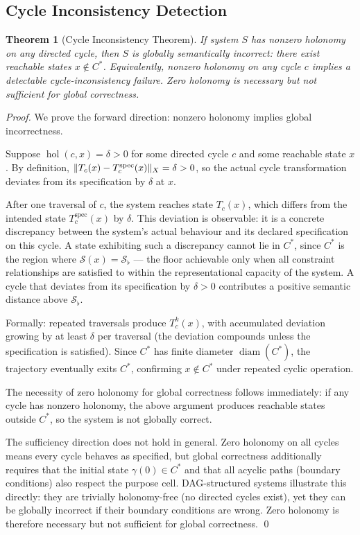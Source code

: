 \documentclass[twocolumn,a4paper,11pt]{article}
\theoremstyle{plain}
\newtheorem{theorem}{Theorem}[section]
\theoremstyle{definition}
\theoremstyle{remark}
\DeclareMathOperator{\hol}{hol}
\DeclareMathOperator{\diam}{diam}
\DeclarePairedDelimiter{\norm}{\lVert}{\rVert}
\newcommand{\Sflat}{\mathcal{S}_{\flat}}
\begin{document}
\subsection{Cycle Inconsistency Detection}

\begin{theorem}[Cycle Inconsistency Theorem]
\label{thm:hac}
If system $S$ has nonzero holonomy on any directed cycle, then $S$ is
globally semantically incorrect: there exist reachable states $x \notin C^*$.
Equivalently, nonzero holonomy on any cycle $c$ implies a detectable
cycle-inconsistency failure. Zero holonomy is necessary but not sufficient
for global correctness.
\end{theorem}

\begin{proof}
We prove the forward direction: nonzero holonomy implies global incorrectness.

Suppose $\hol(c, x) = \delta > 0$ for some directed cycle $c$ and some
reachable state $x$. By definition,
$\norm{T_c(x) - T_c^{\mathrm{spec}}(x)}_X = \delta > 0$, so the actual
cycle transformation deviates from its specification by $\delta$ at $x$.

After one traversal of $c$, the system reaches state $T_c(x)$, which
differs from the intended state $T_c^{\mathrm{spec}}(x)$ by $\delta$.
This deviation is observable: it is a concrete discrepancy between the
system's actual behaviour and its declared specification on this cycle.
A state exhibiting such a discrepancy cannot lie in $C^*$, since $C^*$
is the region where $\mathcal{S}(x) = \Sflat$ --- the floor achievable
only when all constraint relationships are satisfied to within the
representational capacity of the system. A cycle that deviates from its
specification by $\delta > 0$ contributes a positive semantic distance
above $\Sflat$.

Formally: repeated traversals produce $T_c^k(x)$, with accumulated
deviation growing by at least $\delta$ per traversal (the deviation
compounds unless the specification is satisfied). Since $C^*$ has
finite diameter $\diam(C^*)$, the trajectory eventually exits $C^*$,
confirming $x \notin C^*$ under repeated cyclic operation.

The necessity of zero holonomy for global correctness follows immediately:
if any cycle has nonzero holonomy, the above argument produces reachable
states outside $C^*$, so the system is not globally correct.

The sufficiency direction does not hold in general. Zero holonomy on all
cycles means every cycle behaves as specified, but global correctness
additionally requires that the initial state $\gamma(0) \in C^*$ and that
all acyclic paths (boundary conditions) also respect the purpose cell.
DAG-structured systems illustrate this directly: they are trivially
holonomy-free (no directed cycles exist), yet they can be globally incorrect
if their boundary conditions are wrong. Zero holonomy is therefore necessary
but not sufficient for global correctness. \qed
\end{proof}
\end{document}
